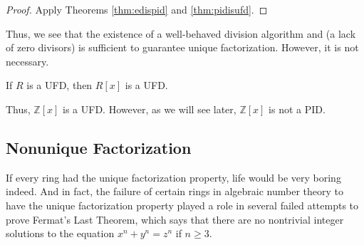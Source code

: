 \documentclass[english,course]{lecture}
\renewcommand{\ge}{\geqslant}
\newenvironment{facnote}{\startfacnote}{}
\def\startfacnote#1\end{\margintext{{\sc Note:} #1}\end}
\newenvironment{hint}{\startimportant}{}
\def\startimportant#1\end{[{Hint:} #1]\end}
\theoremstyle{plain}
\def\Z{{\mathbb Z}}
\def\presnotes{}
\begin{document}
\begin{proof}
	Apply Theorems \ref{thm:edispid} and \ref{thm:pidisufd}.
\end{proof}

\presnotes



\presnotes

Thus, we see that the existence of a well-behaved division algorithm and (a lack of zero divisors) is sufficient to guarantee unique factorization.
However, it is not necessary. 


\begin{unnumberedtheorem}
	If $R$ is a UFD, then $R[x]$ is a UFD.
\end{unnumberedtheorem}

Thus, $\Z[x]$ is a UFD.
However, as we will see later, $\Z[x]$ is not a PID.









\subsection{Nonunique Factorization}\label{sec:nonuniquefactorization}


If every ring had the unique factorization property, life would be very boring indeed.
And in fact, the failure of certain rings in algebraic number theory to have the unique factorization property played a role in several failed attempts to prove Fermat's Last Theorem, which says that there are no nontrivial integer solutions to the equation $x^n + y^n = z^n$ if $n \ge 3$.
\end{document}
